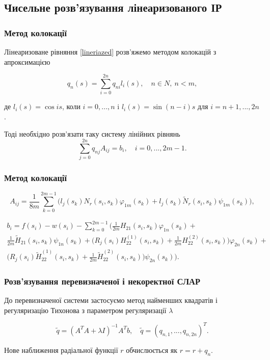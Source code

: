 \documentclass[10pt]{beamer}
\begin{document}
\subsection{Чисельне розв'язування лінеаризованого ІР}
 \begin{frame}
\frametitle{Метод колокації}

Лінеаризоване рівняння \eqref{lineriazed} розв'яжемо методом колокацій з апроксимацією 
 
\begin{equation}
q_n(s)=\sum_{i=0}^{2n}q_{ni}l_i(s), \quad n\in N, \ n<m, \nonumber
 \end{equation}
 
 де $l_i(s)=\cos is$, коли $i=0,...,n$ i $l_i(s)=\sin(n-i)s$ для $i=n+1,...,2n$.
  
  Тоді необхідно розв'язати таку систему лінійних рівнянь
 \begin{equation}
 \label{illSys}
\sum_{j=0}^{2n}q_{nj}A_{ij}=b_i, \quad i=0,...,2m-1.
 \end{equation} 
 
\end{frame}

\begin{frame}
\frametitle{Метод колокації}

\begin{equation}
A_{ij}=\frac{1}{8m}\sum_{k=0}^{2m-1}\Big(l_{j}(s_k)N_r(s_i,s_k)\varphi_{1m}(s_k)+l_{j}(s_k)\tilde{N}_r(s_i,s_k)\psi_{1m}(s_k)\Big), \nonumber
 \end{equation} 
 
  \begin{equation}
 \begin{multlined}
 b_i=f(s_i)-w(s_i)-\sum_{k=0}^{2m-1}\Big(\frac{1}{2m}H_{21}(s_i,s_k)\varphi_{1n}(s_k)+\\ \frac{1}{2m}\tilde{H}_{21}(s_i,s_k)\psi_{1n}(s_k)+\big(R_j(s_i)H_{22}^{(1)}(s_i,s_k)+\frac{1}{2m}H_{22}^{(2)}(s_i,s_k)\big)\varphi_{2n}(s_k)+\\ \big(R_j(s_i)\tilde{H}_{22}^{(1)}(s_i,s_k)+\frac{1}{2m}\tilde{H}_{22}^{(2)}(s_i,s_k)\big)\psi_{2n}(s_k)\Big). \nonumber
 \end{multlined}
 \end{equation} 
 
\end{frame}

\begin{frame}
\frametitle{Розв'язування перевизначеної і некоректної СЛАР}

До перевизначеної системи застосуємо метод найменших квадратів і регуляризацію Тихонова з параметром регуляризації $\lambda$

 \begin{equation}
\tilde{q}=(A^T A+\lambda I)^{-1}A^T b, \quad \tilde{q}=(q_{n,1}, ..., q_{n,2n})^T .
 \end{equation} 
 
 Нове наближення радіальної функції $r$ обчислюється як $r=r+q_n$.
 
\end{frame}
\end{document}
